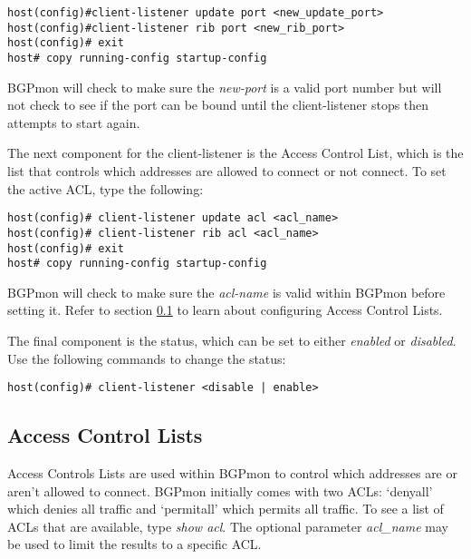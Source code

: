 \begin{Verbatim}[frame=single]
host(config)#client-listener update port <new_update_port>
host(config)#client-listener rib port <new_rib_port>
host(config)# exit
host# copy running-config startup-config
\end{Verbatim}

BGPmon will check to make sure the \emph{new-port} is a valid port number but will not check to see if the port can be bound until the client-listener stops then attempts to start again.

The next component for the client-listener is the Access Control List, which is the list that controls which addresses are allowed to connect or not connect. To set the active ACL, type the following:\\

\begin{Verbatim}[frame=single]
host(config)# client-listener update acl <acl_name>
host(config)# client-listener rib acl <acl_name>
host(config)# exit
host# copy running-config startup-config
\end{Verbatim}

BGPmon will check to make sure the \emph{acl-name} is valid within BGPmon before setting it.  Refer to section \ref{sec:configure:acl} to learn about configuring Access Control Lists.

The final component is the status, which can be set to either \emph{enabled} or \emph{disabled}. Use the following commands to change the status:\\

\begin{Verbatim}[frame=single]
host(config)# client-listener <disable | enable>
\end{Verbatim}


\subsection{Access Control Lists}
\label{sec:configure:acl}

Access Controls Lists are used within BGPmon to control which addresses are or aren't allowed to connect.
BGPmon initially comes with two ACLs: `denyall' which denies all traffic and `permitall' which permits all traffic.
To see a list of ACLs that are available, type \emph{show acl}.
The optional parameter \emph{acl\_name} may be used to limit the results to a specific ACL.

